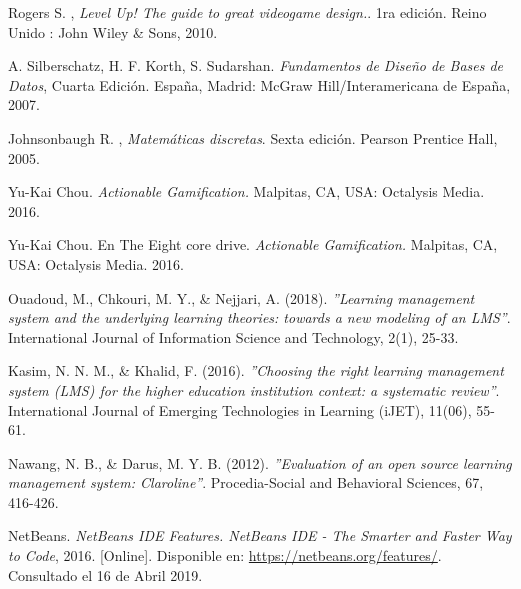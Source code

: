 \begin{thebibliography}{9}
        Rogers S. , \textit{Level Up! The guide to great videogame design.}. 1ra edición. Reino Unido : John Wiley \& Sons, 2010. 
        
        A. Silberschatz, H. F. Korth, S. Sudarshan. \textit{Fundamentos de Diseño de Bases de Datos}, Cuarta Edición. España, Madrid: McGraw Hill/Interamericana de España,  2007.
        
        Johnsonbaugh R. , \textit{Matemáticas discretas}. Sexta edición. Pearson Prentice Hall, 2005.
        
        Yu-Kai Chou.
        \textit{Actionable Gamification.}
        Malpitas, CA, USA: Octalysis Media. 2016. 
    
    
        Yu-Kai Chou.
        En The Eight core drive.
        \textit{Actionable Gamification.}
        Malpitas, CA, USA: Octalysis Media. 2016. 
    
        Ouadoud, M., Chkouri, M. Y., \& Nejjari, A. (2018). {\it''Learning management system and the underlying learning theories: towards a new modeling of an LMS''}. International Journal of Information Science and Technology, 2(1), 25-33.
        
        Kasim, N. N. M., \& Khalid, F. (2016). {\it''Choosing the right learning management system (LMS) for the higher education institution context: a systematic review''}. International Journal of Emerging Technologies in Learning (iJET), 11(06), 55-61.
    
        Nawang, N. B., \& Darus, M. Y. B. (2012). {\it''Evaluation of an open source learning management system: Claroline''}. Procedia-Social and Behavioral Sciences, 67, 416-426.

    
    
    
        NetBeans. {\it NetBeans IDE Features. NetBeans IDE - The Smarter and Faster Way to Code}, 2016. [Online]. Disponible en: \url{https://netbeans.org/features/}. Consultado el 16 de Abril 2019.
    

\end{thebibliography}
